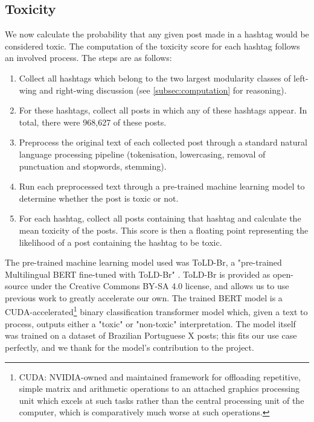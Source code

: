 \documentclass[a4paper,11pt]{article}  %
\begin{document}
	\subsection{Toxicity}
	\label{subsec:toxicity}
	We now calculate the probability that any given post made in a hashtag would be considered toxic.
	The computation of the toxicity score for each hashtag follows an involved process. The steps are as follows:
	\begin{enumerate}
		\item Collect all hashtags which belong to the two largest modularity classes of left-wing and right-wing discussion (see \autoref{subsec:computation} for reasoning).
		\item \label{step2}For these hashtags, collect all posts in which any of these hashtags appear. In total, there were 968,627 of these posts.
		\item Preprocess the original text of each collected post through a standard natural language processing pipeline (tokenisation, lowercasing, removal of punctuation and stopwords, stemming).
		\item Run each preprocessed text through a pre-trained machine learning model to determine whether the post is toxic or not.
		\item For each hashtag, collect all posts containing that hashtag and calculate the mean toxicity of the posts. This score is then a floating point representing the likelihood of a post containing the hashtag to be toxic.
	\end{enumerate}
	The pre-trained machine learning model used was ToLD-Br, a "pre-trained Multilingual BERT fine-tuned with ToLD-Br" \parencite{leiteToxicLanguageDetection2020}. ToLD-Br is provided as open-source under the Creative Commons BY-SA 4.0 license, and allows us to use previous work to greatly accelerate our own. The trained BERT model is a CUDA-accelerated\footnote{CUDA: NVIDIA-owned and maintained framework for offloading repetitive, simple matrix and arithmetic operations to an attached graphics processing unit which excels at such tasks rather than the central processing unit of the computer, which is comparatively much worse at such operations.} binary classification transformer model which, given a text to process, outputs either a "toxic" or "non-toxic" interpretation. The model itself was trained on a dataset of Brazilian Portuguese X posts; this fits our use case perfectly, and we thank \citeauthor{leiteToxicLanguageDetection2020} for the model's contribution to the project.
	
\end{document}
